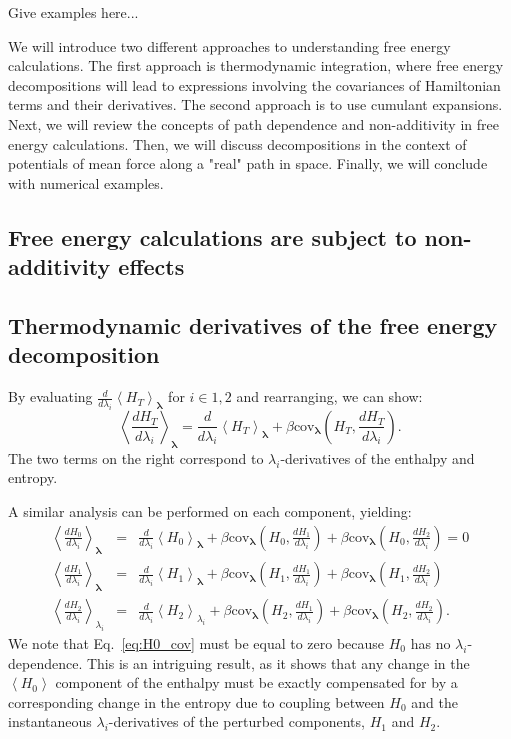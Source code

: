\documentclass[%
 preprint,
 amsmath,amssymb,
 aps,
]{revtex4-1}
\renewcommand{\vec}[1]{{\bm{#1}}}
\begin{document}
Give examples here...

We will introduce two different approaches to understanding free energy calculations. The first approach is thermodynamic integration, where free energy decompositions will lead to expressions involving the covariances of Hamiltonian terms and their derivatives. The second approach is to use cumulant expansions. Next, we will review the concepts of path dependence and non-additivity in free energy calculations. Then, we will discuss decompositions in the context of potentials of mean force along a "real" path in space. Finally, we will conclude with numerical examples.

\subsection{Free energy calculations are subject to non-additivity effects}

\subsection{Thermodynamic derivatives of the free energy decomposition}
\label{s:CumulantDerv}

By evaluating $\frac{d}{d\lambda_i}\left<H_T\right>_{\vec\lambda}$ for $i \in {1, 2}$ and rearranging, we can show:
\begin{equation}
\left<\frac{dH_T}{d\lambda_i}\right>_{\vec\lambda} = 
\frac{d}{d\lambda_i}\left<H_T\right>_{\vec\lambda} +
\beta \mathrm{cov}_{\vec\lambda}\left(H_T, \frac{dH_T}{d\lambda_i} \right).
\label{eq:deriv}
\end{equation}
The two terms on the right correspond to $\lambda_i$-derivatives of the enthalpy and entropy.

A similar analysis can be performed on each component, yielding:
\begin{eqnarray}
\left<\frac{dH_0}{d\lambda_i}\right>_{\vec\lambda} &=& 
\frac{d}{d\lambda_i}\left<H_0\right>_{\vec\lambda} +
\beta\mathrm{cov}_{\vec\lambda}\left(H_0, \frac{dH_1}{d\lambda_i} \right)+
\beta\mathrm{cov}_{\vec\lambda}\left(H_0, \frac{dH_2}{d\lambda_i} \right)
\label{eq:H0_cov}=0\\
\left<\frac{dH_1}{d\lambda_i}\right>_{\vec\lambda} &=& 
\frac{d}{d\lambda_i}\left<H_1\right>_{\vec\lambda} +
\beta\mathrm{cov}_{\vec\lambda}\left(H_1, \frac{dH_1}{d\lambda_i} \right)+
\beta\mathrm{cov}_{\vec\lambda}\left(H_1, \frac{dH_2}{d\lambda_i} \right)\\
\left<\frac{dH_2}{d\lambda_i}\right>_{\lambda_i} &=& 
\frac{d}{d\lambda_i}\left<H_2\right>_{\lambda_i} +
\beta\mathrm{cov}_{\vec\lambda}\left(H_2, \frac{dH_1}{d\lambda_i} \right)+
\beta\mathrm{cov}_{\vec\lambda}\left(H_2, \frac{dH_2}{d\lambda_i} \right).
\end{eqnarray}
We note that Eq.~\ref{eq:H0_cov} must be equal to zero because $H_0$ has no $\lambda_i$-dependence. This is an intriguing result, as it shows that any change in the $\left<H_0\right>$ component of the enthalpy must be exactly compensated for by a corresponding change in the entropy due to coupling between $H_0$ and the instantaneous $\lambda_i$-derivatives of the perturbed components, $H_1$ and $H_2$.
\end{document}
